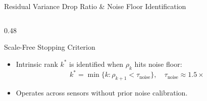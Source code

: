 \documentclass[aspectratio=169, 10pt]{beamer}
\begin{document}
\begin{frame}{Residual Variance Drop Ratio \& Noise Floor Identification}
\begin{columns}[T]
\begin{column}{0.48\textwidth}
      \begin{block}{Scale-Free Stopping Criterion}
        \footnotesize
        \begin{itemize}\setlength{\itemsep}{2pt}
          \item Intrinsic rank $k^*$ is identified when $\rho_k$ hits noise floor:
          $$k^* = \min \{ k : \rho_{k+1} < \tau_{\text{noise}} \}, \quad \tau_{\text{noise}} \approx 1.5\times$$
          \item Operates across sensors without prior noise calibration.
        \end{itemize}
      \end{block}
    \end{column}
  \end{columns}
\end{frame}
\end{document}
